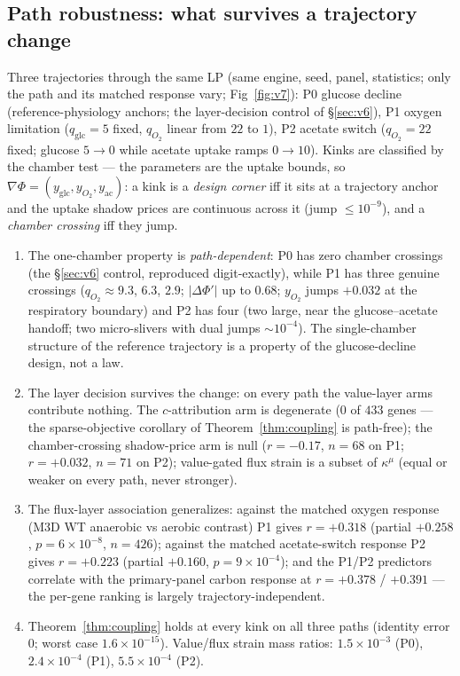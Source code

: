 \documentclass[11pt,a4paper]{article}
\theoremstyle{plain}
\theoremstyle{definition}
\theoremstyle{remark}
\newcommand{\kmu}{\kappa^{\mu}}
\begin{document}
\subsection{Path robustness: what survives a trajectory change}
\label{sec:v7}
Three trajectories through the same LP (same engine, seed, panel, statistics; only the path and its matched response vary; Fig~\ref{fig:v7}): P0 glucose decline (reference-physiology anchors; the layer-decision control of \S\ref{sec:v6}), P1 oxygen limitation
($q_{\mathrm{glc}} = 5$ fixed, $q_{O_2}$ linear from $22$ to $1$),
P2 acetate switch ($q_{O_2} = 22$ fixed; glucose $5 \to 0$ while
acetate uptake ramps $0 \to 10$). Kinks are classified by the
chamber test --- the parameters are the uptake bounds, so
$\nabla\Phi = (y_{\mathrm{glc}}, y_{O_2}, y_{\mathrm{ac}})$: a kink is
a \emph{design corner} iff it sits at a trajectory anchor and the
uptake shadow prices are continuous across it (jump $\le 10^{-9}$),
and a \emph{chamber crossing} iff they jump.
\begin{enumerate}[label=(\roman*),leftmargin=2em]
\item The one-chamber property is \emph{path-dependent}: P0 has zero
      chamber crossings (the \S\ref{sec:v6} control, reproduced digit-exactly), while P1 has
      three genuine crossings ($q_{O_2} \approx 9.3$, $6.3$, $2.9$;
      $|\Delta\Phi'|$ up to $0.68$; $y_{O_2}$ jumps $+0.032$ at the
      respiratory boundary) and P2 has four (two large, near the
      glucose--acetate handoff; two micro-slivers with dual jumps
      $\sim 10^{-4}$). The single-chamber structure of the reference trajectory is a property of the glucose-decline design, not a law.
\item The layer decision survives the change: on every path the
      value-layer arms contribute nothing. The $c$-attribution arm is
      degenerate ($0$ of $433$ genes --- the sparse-objective
      corollary of Theorem~\ref{thm:coupling} is path-free); the
      chamber-crossing shadow-price arm is null ($r = -0.17$,
      $n = 68$ on P1; $r = +0.032$, $n = 71$ on P2); value-gated flux
      strain is a subset of $\kmu$ (equal or weaker on every path,
      never stronger).
\item The flux-layer association generalizes: against the matched
      oxygen response (M3D WT anaerobic vs aerobic contrast) P1 gives
      $r = +0.318$ (partial $+0.258$, $p = 6 \times 10^{-8}$,
      $n = 426$); against the matched acetate-switch response P2
      gives $r = +0.223$ (partial $+0.160$, $p = 9 \times
      10^{-4}$); and the P1/P2 predictors correlate with the primary-panel carbon response at $r = +0.378$ / $+0.391$ --- the per-gene
      ranking is largely trajectory-independent.
\item Theorem~\ref{thm:coupling} holds at every kink on all three
      paths (identity error $0$; worst case $1.6 \times 10^{-15}$).
      Value/flux strain mass ratios: $1.5 \times 10^{-3}$ (P0),
      $2.4 \times 10^{-4}$ (P1), $5.5 \times 10^{-4}$ (P2).
\end{enumerate}
\end{document}
